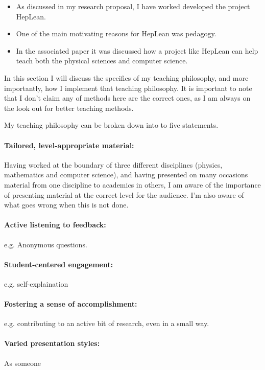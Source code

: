 \documentclass[14pt,letter]{article}
\newcounter{customtitle}
\begin{document}
\begin{itemize}
\item  As discussed in my research proposal, I have worked developed 
the project HepLean.
\item One of the main motivating reasons for HepLean was pedagogy. 
\item In the associated paper it was discussed how a project like HepLean can 
help teach both the physical sciences and computer science.
\end{itemize}
In this section I will discuss the specifics of my teaching philosophy, 
and more importantly, how I implement that teaching philosophy. 
It is important to note that I don't claim any of methods here are the correct 
ones, as I am always on the look out for better teaching methods.

My teaching philosophy can be broken down into to five statements.

\paragraph{Tailored, level-appropriate material:} Having worked at the boundary of three different disciplines (physics, mathematics and computer science), and having presented on many occasions material from one  discipline to academics in others, I am aware of the importance of presenting material at the correct level for the audience. I'm also aware of what goes wrong when this is not done. 

\paragraph{Active listening to feedback:} e.g. Anonymous questions.

\paragraph{Student-centered engagement:}  e.g. self-explaination

\paragraph{Fostering a sense of accomplishment:} e.g. contributing to an active bit of research, even in a small way. 

\paragraph{Varied presentation styles:} As someone 
\end{document}
